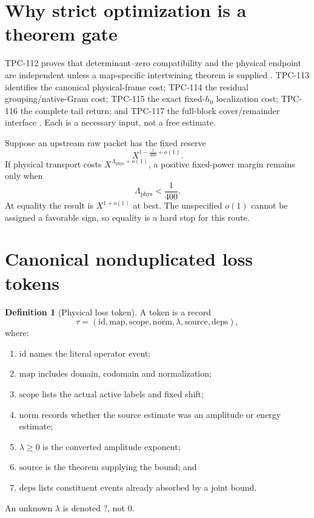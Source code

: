 \documentclass[11pt]{article}
\theoremstyle{definition}
\newtheorem{definition}[theorem]{Definition}
\theoremstyle{remark}
\newcommand{\Lam}{\Lambda_{\mathrm{phys}}}
\newcommand{\epsend}{\frac1{400}}
\begin{document}
\section{Why strict optimization is a theorem gate}

TPC-112 proves that determinant--zero compatibility and the physical
endpoint are independent unless a map-specific intertwining theorem
is supplied \citep{WangTPC112}.  TPC-113 identifies the canonical
physical-frame cost; TPC-114 the residual grouping/native-Gram cost;
TPC-115 the exact fixed-\(h_0\) localization cost; TPC-116 the
complete tail return; and TPC-117 the full-block cover/remainder
interface \citep{WangTPC113,WangTPC114,WangTPC115,WangTPC116,WangTPC117}.
Each is a necessary input, not a free estimate.

Suppose an upstream raw packet has the fixed reserve
\[
 X^{1-\epsend+o(1)}.
\]
If physical transport costs \(X^{\Lam+o(1)}\), a positive
fixed-power margin remains only when
\[
 \boxed{\Lam<\epsend.}
\]
At equality the result is \(X^{1+o(1)}\) at best.  The unspecified
\(o(1)\) cannot be assigned a favorable sign, so equality is a hard
stop for this route.

\section{Canonical nonduplicated loss tokens}

\begin{definition}[Physical loss token]
\label{def:token}
A token is a record
\[
 \tau=(\mathrm{id},\mathrm{map},\mathrm{scope},
       \mathrm{norm},\lambda,\mathrm{source},\mathrm{deps}),
\]
where:
\begin{enumerate}[label=(\roman*),leftmargin=2em]
\item \(\mathrm{id}\) names the literal operator event;
\item \(\mathrm{map}\) includes domain, codomain and normalization;
\item \(\mathrm{scope}\) lists the actual active labels and fixed
  shift;
\item \(\mathrm{norm}\) records whether the source estimate was an
  amplitude or energy estimate;
\item \(\lambda\ge0\) is the converted amplitude exponent;
\item \(\mathrm{source}\) is the theorem supplying the bound; and
\item \(\mathrm{deps}\) lists constituent events already absorbed by
  a joint bound.
\end{enumerate}
An unknown \(\lambda\) is denoted \(?\), not \(0\).
\end{definition}
\end{document}
